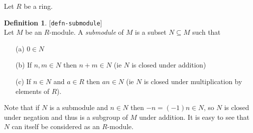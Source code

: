 \documentclass{amsart}
\newcommand{\lbl}[1]{\label{#1}\textup{[\texttt{#1}]}\ \\}
\newcommand{\lbl}{\label}
\newcommand{\sse}       {\subseteq}
\renewcommand{\:}{\colon}
\theoremstyle{definition}
\newtheorem{definition}[theorem]{Definition}
\begin{document}
Let $R$ be a ring.
\begin{definition}\lbl{defn-submodule}
 Let $M$ be an $R$-module.  A \emph{submodule} of $M$ is a subset
 $N\sse M$ such that
 \begin{itemize}
 \item[(a)] $0\in N$
 \item[(b)] If $n,m\in N$ then $n+m\in N$ (ie $N$ is closed under
  addition)
 \item[(c)] If $n\in N$ and $a\in R$ then $an\in N$ (ie $N$ is closed
  under multiplication by elements of $R$).
 \end{itemize}
\end{definition}
Note that if $N$ is a submodule and $n\in N$ then $-n=(-1)n\in N$, so
$N$ is closed under negation and thus is a subgroup of $M$ under
addition.  It is easy to see that $N$ can itself be considered as an
$R$-module. 
\end{document}
